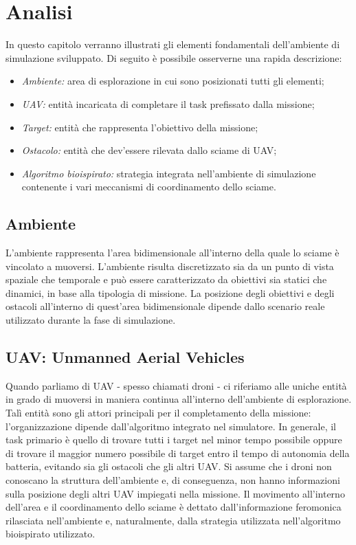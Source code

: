 \chapter{Analisi} \label{analisi}

In questo capitolo verranno illustrati gli elementi fondamentali dell'ambiente di simulazione sviluppato.
Di seguito è possibile osserverne una rapida descrizione:

\begin{itemize}
    \item \textit{Ambiente:} area di esplorazione in cui sono posizionati tutti gli elementi;
    \item \textit{UAV:} entità incaricata di completare il task prefissato dalla missione;
    \item \textit{Target:} entità che rappresenta l'obiettivo della missione;
    \item \textit{Ostacolo:} entità che dev'essere rilevata dallo sciame di UAV;
    \item \textit{Algoritmo bioispirato:} strategia integrata nell'ambiente di simulazione contenente i vari meccanismi di coordinamento dello sciame.

\end{itemize}

\section{Ambiente}

L'ambiente rappresenta l'area bidimensionale all'interno della quale lo sciame è vincolato a muoversi.
L'ambiente risulta discretizzato sia da un punto di vista spaziale che temporale e può essere caratterizzato da obiettivi sia statici che dinamici, in base alla tipologia di missione.
La posizione degli obiettivi e degli ostacoli all'interno di quest'area bidimensionale dipende dallo scenario reale utilizzato durante la fase di simulazione.

\section{UAV: Unmanned Aerial Vehicles}

Quando parliamo di UAV - spesso chiamati droni - ci riferiamo alle uniche entità in grado di muoversi in maniera continua all'interno dell'ambiente di esplorazione.
Talì entità sono gli attori principali per il completamento della missione: l'organizzazione dipende dall'algoritmo integrato nel simulatore.
In generale, il task primario è quello di trovare tutti i target nel minor tempo possibile oppure di trovare il maggior numero possibile di target entro il tempo di autonomia della batteria, evitando sia gli ostacoli che gli altri UAV.
Si assume che i droni non conoscano la struttura dell'ambiente e, di conseguenza, non hanno informazioni sulla posizione degli altri UAV impiegati nella missione.
Il movimento all'interno dell'area e il coordinamento dello sciame è dettato dall'informazione feromonica rilasciata nell'ambiente e, naturalmente, dalla strategia utilizzata nell'algoritmo bioispirato utilizzato.

